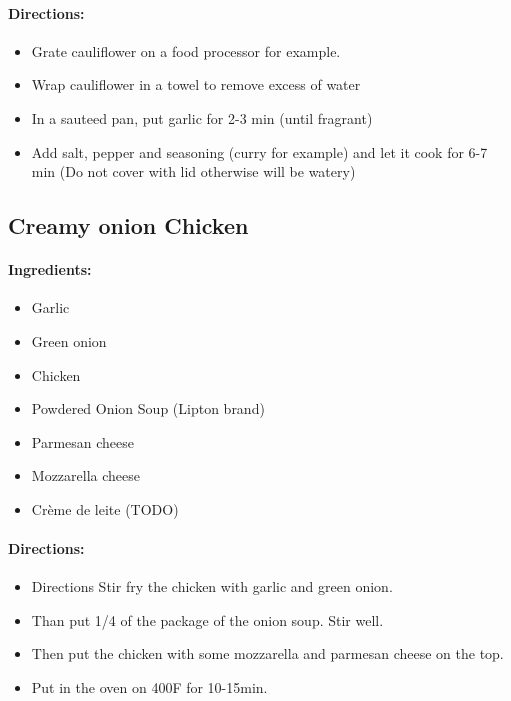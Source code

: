 \documentclass{article}
\begin{document}
\paragraph{Directions:}
\begin{itemize}
    \item Grate cauliflower on a food processor for example.
    \item Wrap cauliflower in a towel to remove excess of water
    \item In a sauteed pan, put garlic for 2-3 min (until fragrant)
    \item Add salt, pepper and seasoning (curry for example) and let it cook for 6-7 min (Do not cover with lid otherwise will be watery)
\end{itemize}

\subsection{Creamy onion Chicken}

\paragraph{Ingredients:}
\begin{itemize}
    \item Garlic
    \item Green onion
    \item Chicken
    \item Powdered Onion Soup (Lipton brand)
    \item Parmesan cheese
    \item Mozzarella cheese
    \item Crème de leite (TODO)
\end{itemize}

\paragraph{Directions:}
\begin{itemize}
    \item Directions Stir fry the chicken with garlic and green onion.
    \item Than put 1/4 of the package of the onion soup. Stir well.
    \item Then put the chicken with some mozzarella and parmesan cheese on the top.
    \item Put in the oven on 400F for 10-15min.
\end{itemize}
\end{document}
